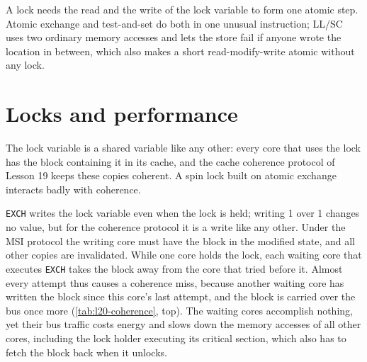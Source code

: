 \documentclass[../main.tex]{subfiles}
\begin{document}
\begin{keypoint}
  A lock needs the read and the write of the lock variable to form one
  atomic step.  Atomic exchange and test-and-set do both in one unusual
  instruction; LL/SC uses two ordinary memory accesses and lets the store
  fail if anyone wrote the location in between, which also makes a short
  read-modify-write atomic without any lock.
\end{keypoint}

\section{Locks and performance}
\label{sec:l20-performance}

The lock variable is a shared variable like any other: every core that uses
the lock has the block containing it in its cache, and the cache coherence
protocol of Lesson 19 keeps these copies coherent.  A spin lock built on atomic exchange interacts badly
with coherence.

\texttt{EXCH} writes the lock variable even when the lock is held; writing 1
over 1 changes no value, but for the coherence protocol it is a write like
any other.  Under the MSI protocol the writing core must have the block in
the modified state, and all other copies are invalidated.  While one core holds the lock, each
waiting core that executes \texttt{EXCH} takes the block away from the core
that tried before it.  Almost every attempt thus
causes a coherence miss, because another waiting core has written the block
since this core's last attempt, and the block is carried over the bus once
more (\cref{tab:l20-coherence}, top).  The waiting cores accomplish nothing,
yet their bus traffic costs energy and slows down the memory accesses of all
other cores, including the lock holder executing its critical section, which
also has to fetch the block back when it unlocks.
\end{document}
